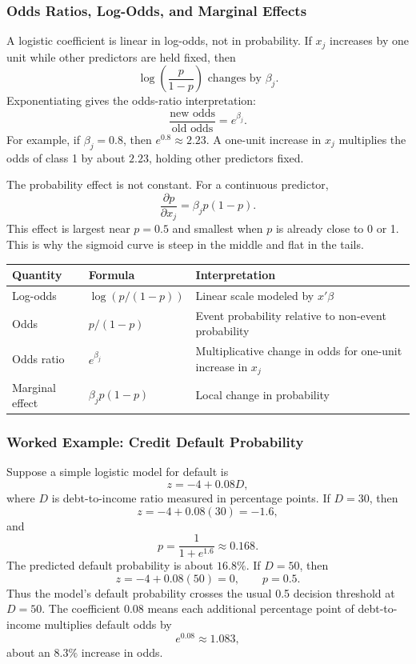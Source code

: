 \documentclass[12pt,openany]{book}
\begin{document}
\subsubsection{Odds Ratios, Log-Odds, and Marginal Effects}

A logistic coefficient is linear in log-odds, not in probability. If \(x_j\) increases by one unit while other predictors are held fixed, then
\[
\log\left(\frac{p}{1-p}\right) \text{ changes by } \beta_j.
\]
Exponentiating gives the odds-ratio interpretation:
\[
\frac{\text{new odds}}{\text{old odds}}=e^{\beta_j}.
\]
For example, if \(\beta_j=0.8\), then \(e^{0.8}\approx 2.23\). A one-unit increase in \(x_j\) multiplies the odds of class 1 by about \(2.23\), holding other predictors fixed.

The probability effect is not constant. For a continuous predictor,
\[
\frac{\partial p}{\partial x_j}=\beta_jp(1-p).
\]
This effect is largest near \(p=0.5\) and smallest when \(p\) is already close to 0 or 1. This is why the sigmoid curve is steep in the middle and flat in the tails.

\begin{center}
\small
\renewcommand{\arraystretch}{1.15}
\begin{tabular}{|L{0.22\textwidth}|L{0.30\textwidth}|L{0.36\textwidth}|}
\hline
    Quantity & Formula & Interpretation \\
\hline
    Log-odds & \(\log(p/(1-p))\) & Linear scale modeled by \(x'\beta\) \\
\hline
    Odds & \(p/(1-p)\) & Event probability relative to non-event probability \\
\hline
    Odds ratio & \(e^{\beta_j}\) & Multiplicative change in odds for one-unit increase in \(x_j\) \\
\hline
    Marginal effect & \(\beta_jp(1-p)\) & Local change in probability \\
\hline
\end{tabular}
\end{center}
\normalsize

\subsubsection{Worked Example: Credit Default Probability}

Suppose a simple logistic model for default is
\[
z=-4+0.08D,
\]
where \(D\) is debt-to-income ratio measured in percentage points. If \(D=30\), then
\[
z=-4+0.08(30)=-1.6,
\]
and
\[
p=\frac{1}{1+e^{1.6}}\approx 0.168.
\]
The predicted default probability is about \(16.8\%\). If \(D=50\), then
\[
z=-4+0.08(50)=0,
\qquad
p=0.5.
\]
Thus the model's default probability crosses the usual 0.5 decision threshold at \(D=50\). The coefficient \(0.08\) means each additional percentage point of debt-to-income multiplies default odds by
\[
e^{0.08}\approx 1.083,
\]
about an \(8.3\%\) increase in odds.
\end{document}
